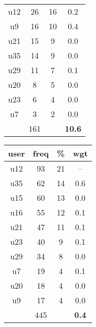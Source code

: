 \begin{appendices}
\begin{table}
\begin{tabular}{ |c|c|c|c| }
	u12 & 26 & 16 & 0.2 \\
	u9 & 16 & 10 & 0.4 \\
	u21 & 15 & 9 & 0.0 \\
	u35 & 14 & 9 & 0.0 \\
	u29 & 11 & 7 & 0.1 \\
	u20 & 8 & 5 & 0.0 \\
	u23 & 6 & 4 & 0.0 \\
	u7 & 3 & 2 & 0.0 \\
	 & 161 & & \textbf{10.6} \\
	\hline
\end{tabular}
\begin{tabular}{ |c|c|c|c| }
	\hline
	\textbf{user} & \textbf{freq} & \textbf{\%} & \textbf{wgt} \\
	\hline
	u12 & 93 & 21 & -- \\
	u35 & 62 & 14 & 0.6 \\
	u15 & 60 & 13 & 0.0 \\
	u16 & 55 & 12 & 0.1 \\
	u21 & 47 & 11 & 0.1 \\
	u23 & 40 & 9 & 0.1 \\
	u29 & 34 & 8 & 0.0 \\
	u7 & 19 & 4 & 0.1 \\
	u20 & 18 & 4 & 0.0 \\
	u9 & 17 & 4 & 0.0 \\
	 & 445 & & \textbf{0.4} \\
	\hline
\end{tabular}
\end{table}


\end{appendices}
